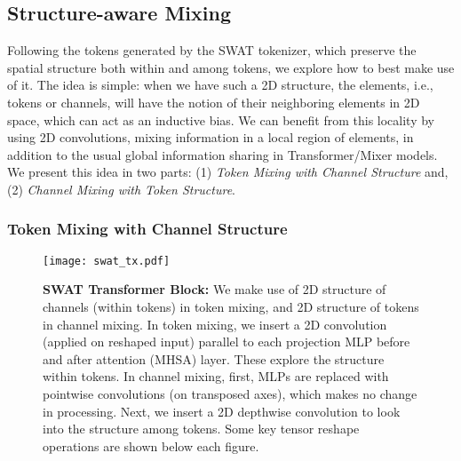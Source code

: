 \documentclass[10pt,twocolumn,letterpaper]{article}
\begin{document}
\subsection{Structure-aware Mixing}

Following the tokens generated by the SWAT tokenizer, which preserve the spatial structure both within and among tokens, we explore how to best make use of it. The idea is simple: when we have such a 2D structure, the elements, i.e., tokens or channels, will have the notion of their neighboring elements in 2D space, which can act as an inductive bias. We can benefit from this locality by using 2D convolutions, mixing information in a local region of elements, in addition to the usual global information sharing in Transformer/Mixer models. We present this idea in two parts: (1) \textit{Token Mixing with Channel Structure} and, (2) \textit{Channel Mixing with Token Structure}.

\subsubsection{Token Mixing with Channel Structure}

\begin{figure}[t]
	\centering
	\vspace{2mm}
	\texttt{[image: swat\_tx.pdf]}
	\caption{\textbf{SWAT Transformer Block:} We make use of 2D structure of channels (within tokens) in token mixing, and 2D structure of tokens in channel mixing. In token mixing, we insert a 2D convolution (applied on reshaped input) parallel to each projection MLP before and after attention (MHSA) layer. These explore the structure within tokens. In channel mixing, first, MLPs are replaced with pointwise convolutions (on transposed axes), which makes no change in processing. Next, we insert a 2D depthwise convolution to look into the structure among tokens. Some key tensor reshape operations are shown below each figure.}
	\label{fig:swat_deit}
\end{figure}
\end{document}
